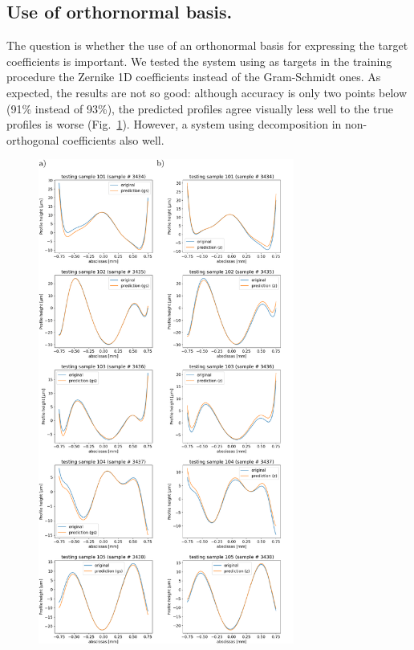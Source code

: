\documentclass[preprint]{iucr}
\begin{document}
\subsection{Use of orthornormal basis.} The question is whether the use of an orthonormal basis for expressing the target coefficients is important. We tested the system using as targets in the training procedure the Zernike 1D coefficients instead of the Gram-Schmidt ones. As expected, the results are not so good: although 
accuracy is only two points below (91\% instead of 93\%), the predicted profiles agree visually less well to the true profiles is worse (Fig.~\ref{fig:v14profiles}). However, a system using decomposition in non-orthogonal coefficients also well. 


\begin{figure}\label{fig:v14profiles}
    \includegraphics[width=0.75\textwidth]{figures/figure4.pdf}


\end{figure}
\end{document}
